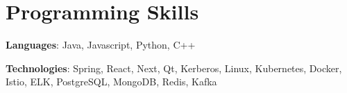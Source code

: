 

\section{Programming Skills}\label{sec:programming-skills}
\resumeSubHeadingListStart
\item{
    \textbf{Languages}{: Java, Javascript, Python, C++}
}
\item{
    \textbf{Technologies}{: Spring, React, Next, Qt, Kerberos, Linux, Kubernetes, Docker, Istio, ELK, PostgreSQL, MongoDB, Redis, Kafka}
}
\resumeSubHeadingListEnd
